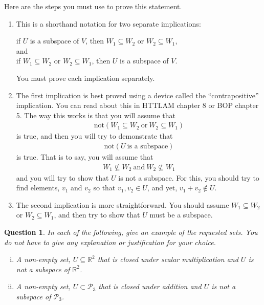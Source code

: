 \documentclass[12pt]{article}
\newtheorem{question}[thm]{Question}
\def\real{{\mathbb R}}
\def\P{\mathcal P}
\begin{document}
Here are the steps you must use to prove this statement.
\begin{enumerate}[1.]
	\item This is a shorthand notation for two separate implications:
	\begin{center}
		if $U$ is a subspace of $V$, then $W_1\subseteq W_2$ or $W_2\subseteq W_1$,\\
		and\\
		if $W_1\subseteq W_2$ or $W_2\subseteq W_1$, then $U$ is a subspace of $V$.
	\end{center}
	You must prove each implication separately.
	
	\item The first implication is best proved using a device called the ``contrapositive'' implication.  You can read about this in HTTLAM chapter 8 or BOP chapter 5.  The way this works is that you will assume that 
	\begin{align*}
		\text{not}(W_1\subseteq W_2\ \text{or}\ W_2\subseteq W_1)
	\end{align*}
	is true, and then you will try to demonstrate that 
	\begin{align*}
		\text{not}(U\ \text{is a subspace})
	\end{align*}
	is true.  That is to say, you will assume that
	\begin{align*}
		W_1\not\subseteq W_2\ \text{and}\ W_2\not\subseteq W_1
	\end{align*}
	and you will try to show that $U$ is not a subspace.  For this, you should try to find elements, $v_1$ and $v_2$ so that $v_1,v_2\in U$, and yet, $v_1+v_2\not\in U$.
	
	
	\item The second implication is more straightforward.  You should assume $W_1\subseteq W_2$ or $W_2\subseteq W_1$, and then try to show that $U$ must be a subspace.  
	
	
\end{enumerate}


\vspace{0.4cm}


\begin{question}
	\normalfont
	
	In each of the following, give an example of the requested sets.  You do not have to give any explanation or justification for your choice.
	
	\begin{enumerate}[(i)]
		\item A \emph{non-empty} set, $U\subseteq\real^2$ that is closed under scalar multiplication and $U$ is not a subspace of $\real^2$.
		
		\item A \emph{non-empty} set, $U\subset\P_3$ that is closed under addition and $U$ is not a subspace of $\P_3$.
	\end{enumerate}
\end{question}
\end{document}
